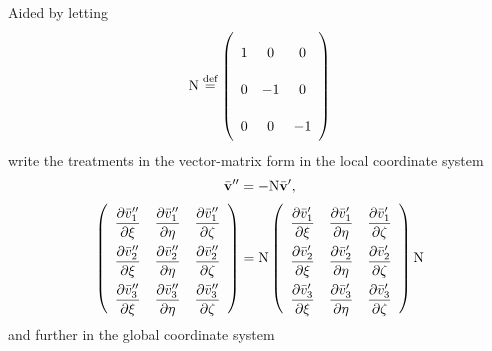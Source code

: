 \documentclass[a4paper,12pt,dvips]{article}
\newcommand*\defeq{\buildrel{\text{def}}\over{=}}
\begin{document}
Aided by letting
\begin{align*}
  \mathrm{N} \defeq \left(\begin{array}{ccc}
    1 & 0 & 0 \\ 0 & -1 & 0 \\ 0 & 0 & -1
  \end{array}\right)
\end{align*}
write the treatments in the vector-matrix form in the local coordinate system
\begin{align*}
\begin{gathered}
  \bar{\mathbf{v}}'' = -\mathrm{N}\bar{\mathbf{v}}', \\
  \renewcommand{\arraystretch}{2.2}
  \left(\begin{array}{ccc}
    \dfrac{\partial \bar{v}''_1}{\partial\xi} &
    \dfrac{\partial \bar{v}''_1}{\partial\eta} &
    \dfrac{\partial \bar{v}''_1}{\partial\zeta} \\
    \dfrac{\partial \bar{v}''_2}{\partial\xi} &
    \dfrac{\partial \bar{v}''_2}{\partial\eta} &
    \dfrac{\partial \bar{v}''_2}{\partial\zeta} \\
    \dfrac{\partial \bar{v}''_3}{\partial\xi} &
    \dfrac{\partial \bar{v}''_3}{\partial\eta} &
    \dfrac{\partial \bar{v}''_3}{\partial\zeta}
  \end{array}\right)
  = \mathrm{N}
  \left(\begin{array}{ccc}
    \dfrac{\partial \bar{v}'_1}{\partial\xi} &
    \dfrac{\partial \bar{v}'_1}{\partial\eta} &
    \dfrac{\partial \bar{v}'_1}{\partial\zeta} \\
    \dfrac{\partial \bar{v}'_2}{\partial\xi} &
    \dfrac{\partial \bar{v}'_2}{\partial\eta} &
    \dfrac{\partial \bar{v}'_2}{\partial\zeta} \\
    \dfrac{\partial \bar{v}'_3}{\partial\xi} &
    \dfrac{\partial \bar{v}'_3}{\partial\eta} &
    \dfrac{\partial \bar{v}'_3}{\partial\zeta}
  \end{array}\right)
  \mathrm{N}
\end{gathered}
\end{align*}
and further in the global coordinate system
\end{document}
